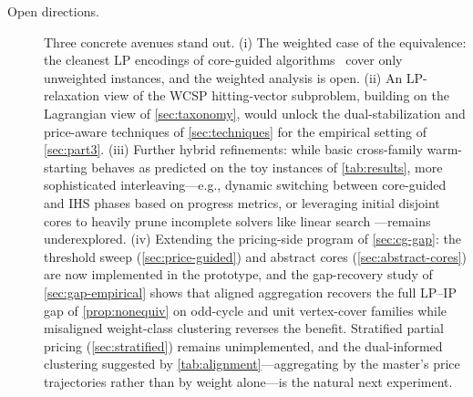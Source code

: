 \begin{description}
\item[Open directions.] Three concrete avenues stand out. (i) The
weighted case of the equivalence: the cleanest LP encodings of core-guided
algorithms~\citep{katsirelos2023analysis} cover only unweighted instances,
and the weighted analysis is open. (ii) An LP-relaxation view of the WCSP
hitting-vector subproblem, building on the Lagrangian view of
\cref{sec:taxonomy}, would unlock the dual-stabilization and price-aware
techniques of \cref{sec:techniques} for the empirical setting of
\cref{sec:part3}. (iii) Further hybrid refinements: while basic
cross-family warm-starting behaves as predicted on the toy instances of
\cref{tab:results}, more sophisticated interleaving---e.g., dynamic switching between core-guided
and IHS phases based on progress metrics, or leveraging initial disjoint cores to heavily prune incomplete solvers like linear search \citep{berg2020core}---remains underexplored.
(iv) Extending the pricing-side program of \cref{sec:cg-gap}: the
threshold sweep (\cref{sec:price-guided}) and abstract cores
(\cref{sec:abstract-cores}) are now implemented in the prototype, and the
gap-recovery study of \cref{sec:gap-empirical} shows that aligned
aggregation recovers the full LP--IP gap of \cref{prop:nonequiv} on
odd-cycle and unit vertex-cover families while misaligned weight-class
clustering reverses the benefit. Stratified partial pricing
(\cref{sec:stratified}) remains unimplemented, and the dual-informed
clustering suggested by \cref{tab:alignment}---aggregating by the
master's price trajectories rather than by weight alone---is the natural
next experiment.
\end{description}

